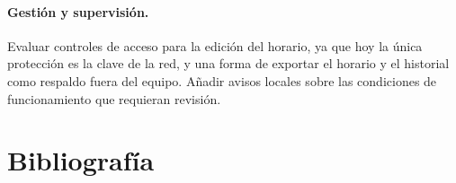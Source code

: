 \documentclass[a4paper,11pt]{article}
\begin{document}
\paragraph{Gestión y supervisión.}
Evaluar controles de acceso para la edición del horario, ya que hoy la única protección es la clave de la red, y una forma de exportar el horario y el historial como respaldo fuera del equipo. Añadir avisos locales sobre las condiciones de funcionamiento que requieran revisión.

\section{Bibliografía}
\begingroup
\small
\renewcommand{\section}[2]{}
\end{document}
